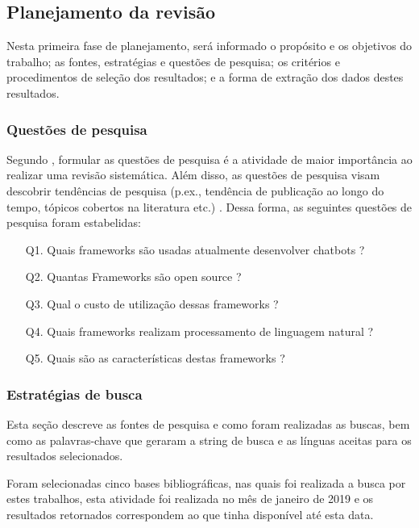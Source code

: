 \subsection{Planejamento da revisão}

Nesta primeira fase de planejamento, será informado o propósito e os objetivos do
trabalho; as fontes, estratégias e questões de pesquisa; os critérios e procedimentos de seleção
dos resultados; e a forma de extração dos dados destes resultados.

\subsubsection{Questões de pesquisa}
Segundo \cite{kitchenham2004procedures}, formular as questões de pesquisa é a atividade de maior importância ao realizar uma revisão sistemática. Além disso,
as questões de pesquisa visam descobrir tendências de pesquisa (p.ex., tendência de publicação ao longo do tempo, tópicos cobertos na literatura etc.) \cite{Kraemer:2007:HFS:1289816.1289837,kitchenham2004procedures,petersen2008systematic}. Dessa forma, as seguintes questões de pesquisa foram estabelidas:


\begin{enumerate}
     \item[Q1.] Quais frameworks são usadas atualmente desenvolver chatbots ?
    \item[Q2.] Quantas Frameworks são open source ?
    \item[Q3.] Qual o custo de utilização dessas frameworks ?
    \item[Q4.] Quais frameworks realizam processamento de linguagem natural ?
    \item[Q5.] Quais são as características destas frameworks ?
\end{enumerate}

\subsubsection{Estratégias de busca }
Esta seção descreve as fontes de pesquisa e como foram realizadas as buscas, bem como as palavras-chave
que geraram a string de busca e as línguas aceitas para os resultados selecionados.

Foram selecionadas cinco bases bibliográficas, nas quais foi realizada a busca por estes
trabalhos, esta atividade foi realizada no mês de janeiro de 2019 e os resultados retornados
correspondem ao que tinha disponível até esta data.

